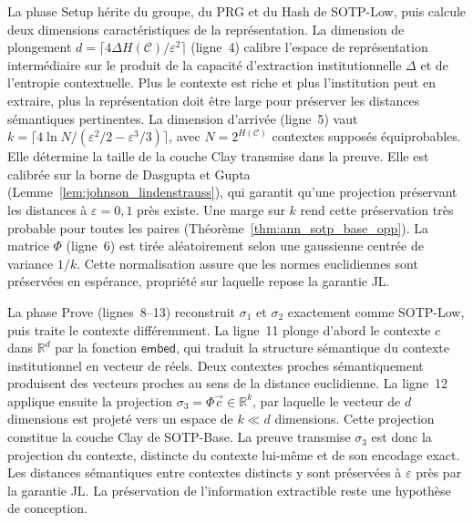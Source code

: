 \begin{sloppypar}
La phase \textsf{Setup} h\'erite du groupe, du PRG et du Hash de
SOTP-Low, puis calcule deux dimensions caract\'eristiques de la
repr\'esentation. La dimension de plongement $d = \lceil 4\Delta
H(\mathcal{C})/\varepsilon^2 \rceil$ (ligne~4) calibre l'espace de
repr\'esentation interm\'ediaire sur le produit de la capacit\'e
d'extraction institutionnelle $\Delta$ et de l'entropie contextuelle. Plus le contexte est riche et plus l'institution peut en extraire,
plus la repr\'esentation doit \^etre large pour pr\'eserver les
distances s\'emantiques pertinentes. La dimension d'arriv\'ee (ligne~5) vaut
$k = \lceil 4\ln N/(\varepsilon^2/2 - \varepsilon^3/3) \rceil$, avec $N = 2^{H(\mathcal{C})}$
contextes suppos\'es \'equiprobables. Elle d\'etermine la taille de la couche Clay transmise
dans la preuve. Elle est calibr\'ee sur la borne de Dasgupta et Gupta~\cite{DasguptaGupta03}
(Lemme~\ref{lem:johnson_lindenstrauss}), qui garantit qu'une projection pr\'eservant les distances
\`a $\varepsilon = 0{,}1$ pr\`es existe. Une marge sur $k$ rend cette pr\'eservation tr\`es probable
pour toutes les paires (Th\'eor\`eme~\ref{thm:ann_sotp_base_opp}). La matrice $\Phi$ (ligne~6) est tir\'ee
al\'eatoirement selon une gaussienne centr\'ee de variance $1/k$. 
Cette normalisation assure que les normes euclidiennes sont pr\'eserv\'ees
en esp\'erance, propri\'et\'e sur laquelle repose la
garantie JL.

La phase \textsf{Prove} (lignes~8--13) reconstruit $\sigma_1$ et
$\sigma_2$ exactement comme SOTP-Low, puis traite le contexte
diff\'eremment. La ligne~11 plonge d'abord le contexte $c$ dans
$\mathbb{R}^d$ par la fonction $\mathsf{embed}$, qui traduit la
structure s\'emantique du contexte institutionnel en vecteur de r\'eels. Deux contextes proches s\'emantiquement produisent des vecteurs proches
au sens de la distance euclidienne. La ligne~12 applique ensuite la
projection $\sigma_3 = \Phi\vec{c} \in \mathbb{R}^k$, par laquelle le vecteur de
$d$ dimensions est projet\'e vers un espace de $k \ll d$ dimensions.
Cette projection constitue la couche Clay de SOTP-Base. La
preuve transmise $\sigma_3$ est donc la projection du contexte,
distincte du contexte lui-m\^eme et de son encodage exact. Les distances
s\'emantiques entre contextes distincts y sont pr\'eserv\'ees \`a
$\varepsilon$ pr\`es par la garantie JL. La pr\'eservation de l'information
extractible reste une hypoth\`ese de conception.


\end{sloppypar}
